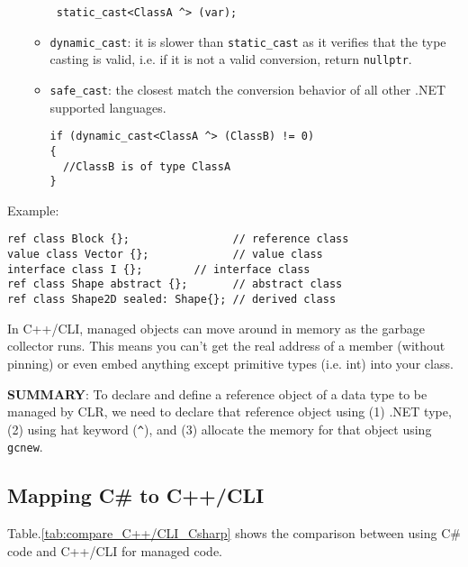 \begin{itemize}
\begin{itemize}
\begin{verbatim}
 static_cast<ClassA ^> (var);
 \end{verbatim}
 
    \item \verb!dynamic_cast!: it is slower than \verb!static_cast! as it
    verifies that the type casting is valid, i.e. if it is not a valid
    conversion, return \verb!nullptr!. 
    
    \item \verb!safe_cast!: the closest match the conversion behavior of all
    other .NET supported languages.
\begin{verbatim}
if (dynamic_cast<ClassA ^> (ClassB) != 0)
{
  //ClassB is of type ClassA
}
\end{verbatim}
  \end{itemize} 
\end{itemize}

Example:
\begin{verbatim}
ref class Block {};                // reference class
value class Vector {};             // value class
interface class I {};        // interface class
ref class Shape abstract {};       // abstract class
ref class Shape2D sealed: Shape{}; // derived class
\end{verbatim}

%   


In C++/CLI, managed objects can move around in memory as the garbage collector
runs. This means you can't get the real address of a member (without pinning) or
even embed anything except primitive types (i.e. int) into your class.  


{\bf SUMMARY}: To declare and define a reference object of a data type to be
managed by CLR, we need to declare that reference object using (1) .NET type,
(2) using hat keyword (\verb!^!), and (3) allocate the memory for that object
using \verb!gcnew!. 


\subsection{Mapping C\# to C++/CLI}

Table.\ref{tab:compare_C++/CLI_Csharp} shows the comparison
between using C\# code and C++/CLI for managed code.


